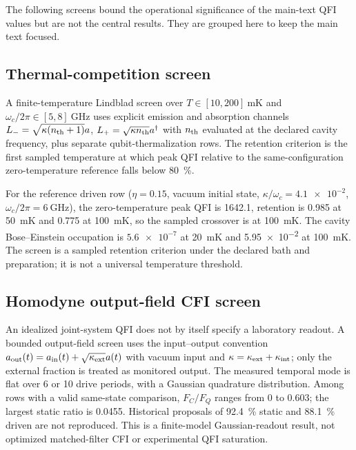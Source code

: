 \documentclass[aps,prxquantum,preprint,superscriptaddress,amsmath,amssymb]{revtex4-2}
\begin{document}
The following screens bound the operational significance of the main-text QFI values but are not the central results. They are grouped here to keep the main text focused.

\subsection{Thermal-competition screen}
\label{sec:si_thermal}

A finite-temperature Lindblad screen over $T\in[\num{10},\num{200}]~\unit{\milli\kelvin}$ and $\omega_c/2\pi\in[\num{5},\num{8}]~\unit{\giga\hertz}$ uses explicit emission and absorption channels $L_-=\sqrt{\kappa(n_{\rm th}+1)}a$, $L_+=\sqrt{\kappa n_{\rm th}}a^\dagger$ with $n_{\rm th}$ evaluated at the declared cavity frequency, plus separate qubit-thermalization rows. The retention criterion is the first sampled temperature at which peak QFI relative to the same-configuration zero-temperature reference falls below \qty{80}{\percent}.

For the reference driven row ($\eta=\num{0.15}$, vacuum initial state, $\kappa/\omega_c=\num{4.1e-2}$, $\omega_c/2\pi=\qty{6}{\giga\hertz}$), the zero-temperature peak QFI is \num{1642.1}, retention is \num{0.985} at \qty{50}{\milli\kelvin} and \num{0.775} at \qty{100}{\milli\kelvin}, so the sampled crossover is at \qty{100}{\milli\kelvin}. The cavity Bose--Einstein occupation is $\num{5.6e-7}$ at \qty{20}{\milli\kelvin} and \num{5.95e-2} at \qty{100}{\milli\kelvin}. The screen is a sampled retention criterion under the declared bath and preparation; it is not a universal temperature threshold.

\subsection{Homodyne output-field CFI screen}

An idealized joint-system QFI does not by itself specify a laboratory readout. A bounded output-field screen uses the input--output convention $a_{\rm out}(t)=a_{\rm in}(t)+\sqrt{\kappa_{\rm ext}}a(t)$ with vacuum input and $\kappa=\kappa_{\rm ext}+\kappa_{\rm int}$; only the external fraction is treated as monitored output. The measured temporal mode is flat over \num{6} or \num{10} drive periods, with a Gaussian quadrature distribution. Among rows with a valid same-state comparison, $F_C/F_Q$ ranges from $0$ to \num{0.603}; the largest static ratio is \num{0.0455}. Historical proposals of \qty{92.4}{\percent} static and \qty{88.1}{\percent} driven are not reproduced. This is a finite-model Gaussian-readout result, not optimized matched-filter CFI or experimental QFI saturation.
\end{document}
